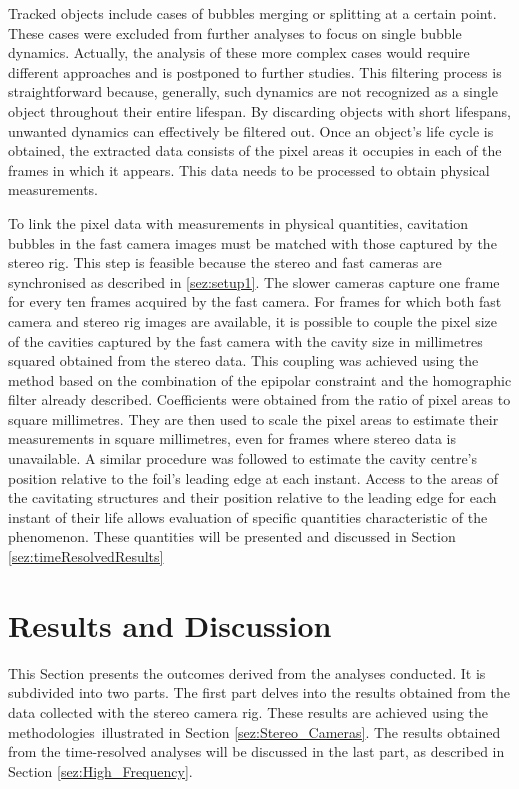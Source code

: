 Tracked objects include cases of bubbles merging or splitting at a certain point. These cases were excluded from further analyses to focus on single bubble dynamics. Actually, the analysis of these more complex cases would require different approaches and is postponed to further studies.
This filtering process is straightforward because, generally, such dynamics are not recognized as a single object throughout their entire lifespan. By discarding objects with short lifespans, unwanted dynamics can effectively be filtered out.
Once an object's life cycle is obtained, the extracted data consists of the pixel areas it occupies in each of the frames in which it appears. This data needs to be processed to obtain physical measurements.

To link the pixel data with measurements in physical quantities, cavitation bubbles in the fast camera images must be matched with those captured by the stereo rig. This step is feasible because the stereo and fast cameras are synchronised as described in \ref{sez:setup1}. The slower cameras capture one frame for every ten frames acquired by the fast camera.
For frames for which both fast camera and stereo rig images are available, it is possible to couple the pixel size of the cavities captured by the fast camera with the cavity size in millimetres squared obtained from the stereo data. This coupling was achieved using the method based on the combination of the epipolar constraint and the homographic filter already described.
Coefficients were obtained from the ratio of pixel areas to square millimetres. They are then used to scale the pixel areas to estimate their measurements in square millimetres, even for frames where stereo data is unavailable. A similar procedure was followed to estimate the cavity centre's position relative to the foil's leading edge at each instant.
Access to the areas of the cavitating structures and their position relative to the leading edge for each instant of their life allows evaluation of specific quantities characteristic of the phenomenon. These quantities will be presented and discussed in Section \ref{sez:timeResolvedResults}

\section{Results and Discussion}
\label{sec_results}
This Section presents the outcomes derived from the analyses conducted. It is subdivided into two parts.
The first part delves into the results obtained from the data collected with the stereo camera rig. These results are achieved using the methodologies illustrated in Section \ref{sez:Stereo_Cameras}.
The results obtained from the time-resolved analyses will be discussed in the last part, as described in Section \ref{sez:High_Frequency}.

